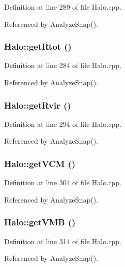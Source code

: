 Definition at line 289 of file Halo.cpp.



Referenced by AnalyzeSnap().

\subsubsection[{getRtot}]{ Halo::getRtot ()}\label{classHalo_acc4fef152c532108d09973848f460c14}


Definition at line 284 of file Halo.cpp.



Referenced by AnalyzeSnap().

\subsubsection[{getRvir}]{ Halo::getRvir ()}\label{classHalo_ab5a35a75689e2bc0ddb683e83e8be49b}


Definition at line 294 of file Halo.cpp.



Referenced by AnalyzeSnap().

\subsubsection[{getVCM}]{ Halo::getVCM ()}\label{classHalo_a2783350477ec2fede9d9e2fb891d35fc}


Definition at line 304 of file Halo.cpp.



Referenced by AnalyzeSnap().

\subsubsection[{getVMB}]{ Halo::getVMB ()}\label{classHalo_a77899ddb0f14ad408d0ca3372e0ca50d}


Definition at line 314 of file Halo.cpp.



Referenced by AnalyzeSnap().

